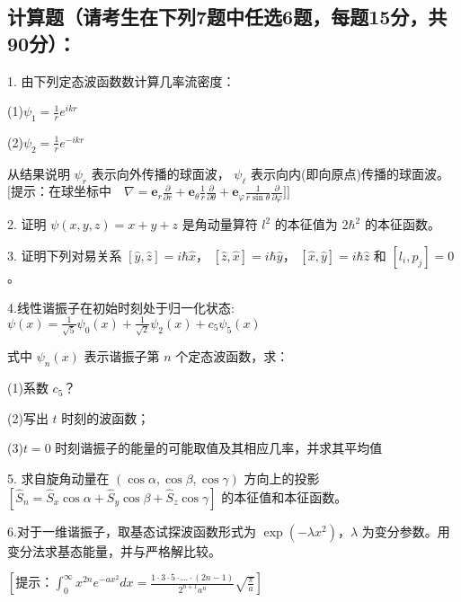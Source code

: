 \subsection{计算题（请考生在下列7题中任选6题，每题15分，共90分）：}

1. 由下列定态波函数数计算几率流密度：

(1)$\psi_1 = \frac{1}{r} e^{ikr}$ 


(2)$\psi_2 = \frac{1}{r} e^{-ikr}$

从结果说明 $\psi_r$ 表示向外传播的球面波， $\psi_\ell$ 表示向内(即向原点)传播的球面波。
$\text{[提示：在球坐标中}\quad \nabla = \mathbf{e}_r \frac{\partial}{\partial r} + \mathbf{e}_\theta \frac{1}{r} \frac{\partial}{\partial \theta} + \mathbf{e}_\varphi \frac{1}{r \sin \theta} \frac{\partial}{\partial \varphi}\text{]}]$

2. 证明 $\psi (x,y,z) = x + y + z$ 是角动量算符 $l^2$ 的本征值为 $2\hbar^2$ 的本征函数。

3. 证明下列对易关系 $[ \hat{y}, \hat{z} ] = i\hbar \hat{x}$， $[\hat{z}, \hat{x}] = i\hbar \hat{y}$， $[\hat{x}, \hat{y}] = i\hbar \hat{z}$ 和 $[l_i, p_j] = 0$。

4.线性谐振子在初始时刻处于归一化状态:
$\psi(x) = \frac{1}{\sqrt{5}} \psi_0(x) + \frac{1}{\sqrt{2}} \psi_2(x) + c_5 \psi_5(x)$

式中 $\psi_n(x)$ 表示谐振子第 $n$ 个定态波函数，求：

(1)系数 $c_5$？

(2)写出 $t$ 时刻的波函数；

(3)$t=0$ 时刻谐振子的能量的可能取值及其相应几率，并求其平均值

5. 求自旋角动量在 $(\cos \alpha, \cos \beta, \cos \gamma)$ 方向上的投影
$[\hat{S}_n = \hat{S}_x \cos \alpha + \hat{S}_y \cos \beta + \hat{S}_z \cos \gamma]$
的本征值和本征函数。

6.对于一维谐振子，取基态试探波函数形式为 $\exp(-\lambda x^2)$，$\lambda$ 为变分参数。用变分法求基态能量，并与严格解比较。

$\left[ \text{提示：} \int_{0}^{\infty} x^{2n} e^{-ax^2} dx = \frac{1 \cdot 3 \cdot 5 \cdot \ldots \cdot (2n-1)}{2^{n+1} a^n} \sqrt{\frac{\pi}{a}} \right]$

